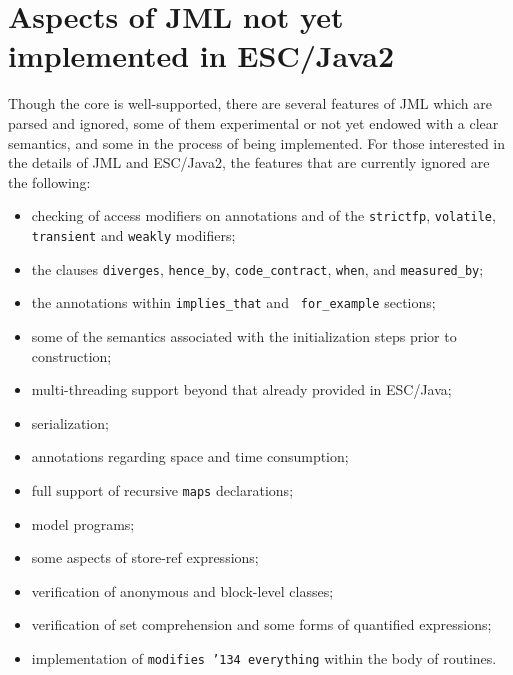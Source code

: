 \documentclass{llncs}
\begin{document}
\section{Aspects of JML not yet\\implemented in ESC/Java2}

Though the core is well-supported, there are several features of JML
which are parsed and ignored, some of them experimental or not yet
endowed with a clear semantics, and some in the process of being
implemented.  For those interested in the details of JML and
ESC/Java2, the features that are currently ignored are the following:
\setlength{\partopsep}{0in}\setlength{\parskip}{0in}\setlength{\itemsep}{0in}\setlength{\topsep}{0in}
\begin{itemize}
\setlength{\partopsep}{0in}\setlength{\parskip}{0in}\setlength{\itemsep}{0in}\setlength{\topsep}{0in}
\item checking of access modifiers on annotations and of the
 \texttt{strictfp}, \texttt{volatile},
  \texttt{transient} and \texttt{weakly} modifiers;
\item the clauses \texttt{diverges}, \texttt{hence\_by},
  \texttt{code\_contract}, \texttt{when}, and \texttt{measured\_by};
\item the annotations within \texttt{implies\_that} and {\tt
    for\_example} sections;
\item some of the semantics associated with the initialization steps prior to
  construction;
\item multi-threading support beyond that already provided in ESC/Java;
\item serialization;
\item annotations regarding space and time consumption;
\item full support of recursive \texttt{maps} declarations;
\item model programs;
\item some aspects of store-ref expressions;
\item verification of anonymous and block-level classes;
\item verification of set comprehension and some forms of quantified
  expressions;
\item implementation of \texttt{modifies \char'134 everything} within
  the body of routines.
\end{itemize}


\end{document}

